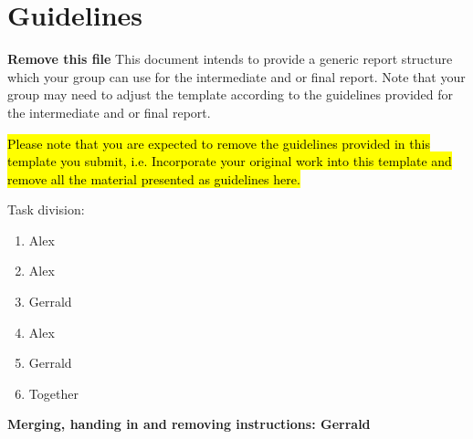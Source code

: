\chapter*{Guidelines}
\textbf{\Large Remove this file}
This document intends to provide a generic report structure which your group can use for the intermediate and or final report. Note that your group may need to adjust the template according to the guidelines provided for the intermediate and or final report. 

\hl{Please note that you are expected to remove the guidelines provided in this template you submit, i.e. Incorporate your original work into this template and remove all the material presented as guidelines here. }


Task division:
\begin{enumerate}
    \item Alex
    \item Alex
    \item Gerrald
    \item Alex
    \item Gerrald
    \item Together
\end{enumerate}

\textbf{Merging, handing in and removing instructions: Gerrald }

\cite{Grit}
\cite{labmanual}